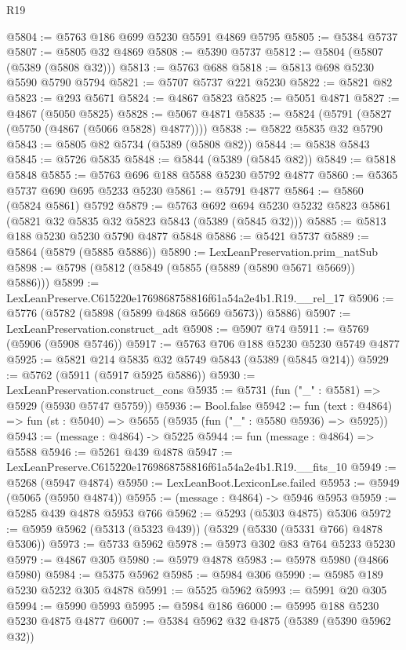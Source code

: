 \begin{lexlean}{R19}
\begin{coremodule}
@5804 := @5763 @186 @699 @5230 @5591 @4869 @5795
@5805 := @5384 @5737
@5807 := @5805 @32 @4869
@5808 := @5390 @5737
@5812 := @5804 (@5807 (@5389 (@5808 @32)))
@5813 := @5763 @688
@5818 := @5813 @698 @5230 @5590 @5790 @5794
@5821 := @5707 @5737 @221 @5230
@5822 := @5821 @82
@5823 := @293 @5671
@5824 := @4867 @5823
@5825 := @5051 @4871
@5827 := @4867 (@5050 @5825)
@5828 := @5067 @4871
@5835 := @5824 (@5791 (@5827 (@5750 (@4867 (@5066 @5828) @4877))))
@5838 := @5822 @5835 @32 @5790
@5843 := @5805 @82 @5734 (@5389 (@5808 @82))
@5844 := @5838 @5843
@5845 := @5726 @5835
@5848 := @5844 (@5389 (@5845 @82))
@5849 := @5818 @5848
@5855 := @5763 @696 @188 @5588 @5230 @5792 @4877
@5860 := @5365 @5737 @690 @695 @5233 @5230
@5861 := @5791 @4877
@5864 := @5860 (@5824 @5861) @5792
@5879 := @5763
    @692
    @694
    @5230
    @5232
    @5823
    @5861
    (@5821 @32 @5835 @32 @5823 @5843 (@5389 (@5845 @32)))
@5885 := @5813 @188 @5230 @5230 @5790 @4877 @5848
@5886 := @5421 @5737
@5889 := @5864 (@5879 (@5885 @5886))
@5890 := LexLeanPreservation.prim_natSub
@5898 := @5798 (@5812 (@5849 (@5855 (@5889 (@5890 @5671 @5669)) @5886)))
@5899 := LexLeanPreserve.C615220e1769868758816f61a54a2e4b1.R19.__rel_17
@5906 := @5776 (@5782 (@5898 (@5899 @4868 @5669 @5673)) @5886)
@5907 := LexLeanPreservation.construct_adt
@5908 := @5907 @74
@5911 := @5769 (@5906 (@5908 @5746))
@5917 := @5763 @706 @188 @5230 @5230 @5749 @4877
@5925 := @5821 @214 @5835 @32 @5749 @5843 (@5389 (@5845 @214))
@5929 := @5762 (@5911 (@5917 @5925 @5886))
@5930 := LexLeanPreservation.construct_cons
@5935 := @5731 (fun ("_" : @5581) => @5929 (@5930 @5747 @5759))
@5936 := Bool.false
@5942 := fun (text : @4864) => fun (st : @5040) => @5655 (@5935 (fun ("_" : @5580 @5936) => @5925))
@5943 := (message : @4864) -> @5225
@5944 := fun (message : @4864) => @5588
@5946 := @5261 @439 @4878
@5947 := LexLeanPreserve.C615220e1769868758816f61a54a2e4b1.R19.__fits_10
@5949 := @5268 (@5947 @4874)
@5950 := LexLeanBoot.LexiconLse.failed
@5953 := @5949 (@5065 (@5950 @4874))
@5955 := (message : @4864) -> @5946 @5953
@5959 := @5285 @439 @4878 @5953 @766
@5962 := @5293 (@5303 @4875) @5306
@5972 := @5959 @5962 (@5313 (@5323 @439)) (@5329 (@5330 (@5331 @766) @4878 @5306))
@5973 := @5733 @5962
@5978 := @5973 @302 @83 @764 @5233 @5230
@5979 := @4867 @305
@5980 := @5979 @4878
@5983 := @5978 @5980 (@4866 @5980)
@5984 := @5375 @5962
@5985 := @5984 @306
@5990 := @5985 @189 @5230 @5232 @305 @4878
@5991 := @5525 @5962
@5993 := @5991 @20 @305
@5994 := @5990 @5993
@5995 := @5984 @186
@6000 := @5995 @188 @5230 @5230 @4875 @4877
@6007 := @5384 @5962 @32 @4875 (@5389 (@5390 @5962 @32))

\end{coremodule}
\end{lexlean}
